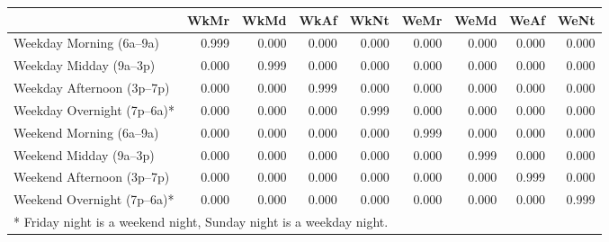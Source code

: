 \begin{tabular}{l | r r r r r r r r}
& WkMr & WkMd & WkAf & WkNt & WeMr & WeMd & WeAf & WeNt \\
\hline
Weekday Morning (6a--9a)   & 0.999 & 0.000 & 0.000 & 0.000 & 0.000 & 0.000 & 0.000 & 0.000 \\
Weekday Midday (9a--3p)    & 0.000 & 0.999 & 0.000 & 0.000 & 0.000 & 0.000 & 0.000 & 0.000 \\
Weekday Afternoon (3p--7p) & 0.000 & 0.000 & 0.999 & 0.000 & 0.000 & 0.000 & 0.000 & 0.000 \\
Weekday Overnight (7p--6a)*& 0.000 & 0.000 & 0.000 & 0.999 & 0.000 & 0.000 & 0.000 & 0.000 \\
Weekend Morning (6a--9a)   & 0.000 & 0.000 & 0.000 & 0.000 & 0.999 & 0.000 & 0.000 & 0.000 \\
Weekend Midday (9a--3p)    & 0.000 & 0.000 & 0.000 & 0.000 & 0.000 & 0.999 & 0.000 & 0.000 \\
Weekend Afternoon (3p--7p) & 0.000 & 0.000 & 0.000 & 0.000 & 0.000 & 0.000 & 0.999 & 0.000 \\
Weekend Overnight (7p--6a)*& 0.000 & 0.000 & 0.000 & 0.000 & 0.000 & 0.000 & 0.000 & 0.999 \\
\hline
\multicolumn{9}{l}{* Friday night is a weekend night, Sunday night is a weekday night.}
\end{tabular}

  
